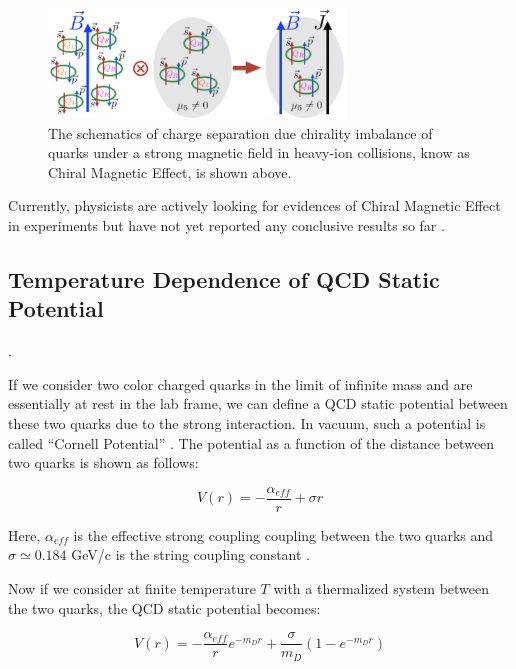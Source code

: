 \begin{figure}[hbtp]
\begin{center}
\includegraphics[width=0.70\textwidth]{Figures/Chapter1/ChiralScheme.png}
\caption{The schematics of charge separation due chirality imbalance of quarks under a strong magnetic field in heavy-ion collisions, know as Chiral Magnetic Effect, is shown above.}
\label{ChiralScheme}
\end{center}
\end{figure} 


Currently, physicists are actively looking for evidences of Chiral Magnetic Effect in experiments but have not yet reported any conclusive results so far \cite{CMEExpResult}. 


\subsection{Temperature Dependence of QCD Static Potential}. 

If we consider two color charged quarks in the limit of infinite mass and are essentially at rest in the lab frame, we can define a QCD static potential between these two quarks due to the strong interaction. In vacuum, such a potential is called ``Cornell Potential'' \cite{Cornell}. The potential as a function of the distance between two quarks is shown as follows:

\begin{equation}
V(r) = -\frac{\alpha_{eff}}{r} + \sigma r
\end{equation}

Here, $\alpha_{eff}$ is the effective strong coupling coupling between the two quarks and $\sigma \simeq 0.184$ GeV/c is the string coupling constant \cite{CornellEquation}. 

Now if we consider at finite temperature $T$ with a thermalized system  between the two quarks, the QCD static potential becomes: 

\begin{equation}
V(r) = -\frac{\alpha_{eff}}{r} e^{-m_D r} + \frac{\sigma}{m_D} (1 - e^{-m_D r})
\end{equation}

